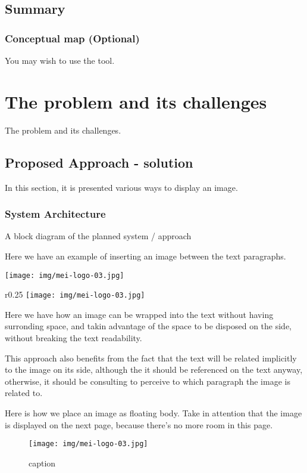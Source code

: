 \documentclass[
  oneside,
  11pt, a4paper,
  footinclude=true,
  headinclude=true,
  cleardoublepage=empty
]{scrbook}
\begin{document}
     \section{Summary}
     	\subsection{Conceptual map (Optional)}
	You may wish to use the  tool.



	\chapter{The problem and its challenges}
	         The problem and its challenges.

	\section{Proposed Approach - solution}
	In this section, it is presented various ways to display an image.
     \subsection{System Architecture}
     A block diagram of the planned system / approach

	Here we have an example of inserting an image between the text paragraphs.
	\begin{center}
		\texttt{[image: img/mei-logo-03.jpg]}
	\end{center}

	\begin{wrapfigure}{r}{0.25\textwidth}
		\texttt{[image: img/mei-logo-03.jpg]}
	\end{wrapfigure}
	Here we have how an image can be wrapped into the text without having surronding space, and takin advantage of the space to be disposed on the side, without breaking the text readability.

	This approach also benefits from the fact that the text will be related implicitly to the image on its side, although the it should be referenced on the text anyway, otherwise, it should be consulting to perceive to which paragraph the image is related to.

	Here is how we place an image as floating body.
	Take in attention that the image is displayed on the next page, because there's no more room in this page.
	\begin{figure}
	\begin{center}
		\texttt{[image: img/mei-logo-03.jpg]}
	\end{center}
	\caption{caption}
	\end{figure}
\end{document}
